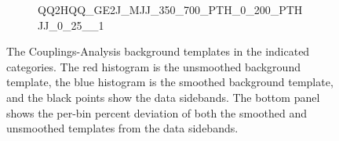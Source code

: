 \begin{figure}
\begin{center}
\begin{subfigure}[T]{0.49\linewidth}
	\caption{\tiny{QQ2HQQ\_GE2J\_MJJ\_350\_700\_PTH\_0\_200\_PTHJJ\_0\_25\_\_1}}
\end{subfigure}
\caption{The Couplings-Analysis background templates in the indicated categories. The red histogram is the unsmoothed background template, the blue histogram is the smoothed background template, and the black points show the data sidebands. The bottom panel shows the per-bin percent deviation of both the smoothed and unsmoothed templates from the data sidebands. }
 \label{fig:gpr_coupcat_13}
 \end{center}
\end{figure}

